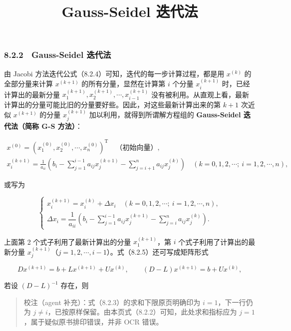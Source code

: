 \documentclass[
  10pt,
  fontset=fandol]{ctexart}
\title{Gauss-Seidel 迭代法}
\author{}
\date{}
\begin{document}
\maketitle

\subsubsection{8.2.2　Gauss-Seidel 迭代法}\label{gauss-seidel-ux8fedux4ee3ux6cd5}

由 Jacobi 方法迭代公式（8.2.4）可知，迭代的每一步计算过程，都是用 \(x^{(k)}\) 的全部分量来计算 \(x^{(k+1)}\) 的所有分量，显然在计算第 \(i\) 个分量 \(x_i^{(k+1)}\) 时，已经计算出的最新分量 \(x_1^{(k+1)},x_2^{(k+1)},\cdots,x_{i-1}^{(k+1)}\) 没有被利用。从直观上看，最新计算出的分量可能比旧的分量要好些。因此，对这些最新计算出来的第 \(k+1\) 次近似 \(x^{(k+1)}\) 的分量 \(x_j^{(k+1)}\) 加以利用，就得到所谓解方程组的 \textbf{Gauss-Seidel 迭代法（简称 G-S 方法）}：

\[
\begin{gathered}
x^{(0)}=(x_1^{(0)},x_2^{(0)},\cdots,x_n^{(0)})^{\mathrm T}\quad\text{（初始向量）},\\[4pt]
x_i^{(k+1)}=\frac1{a_{ii}}\left(b_i-\sum_{j=1}^{i-1}a_{ij}x_j^{(k+1)}-\sum_{j=i+1}^{n}a_{ij}x_j^{(k)}\right)\quad(k=0,1,2,\cdots;\ i=1,2,\cdots,n),
\end{gathered}
\tag{8.2.5}
\]

或写为

\[
\begin{cases}
x_i^{(k+1)}=x_i^{(k)}+\Delta x_i\quad(k=0,1,2,\cdots;\ i=1,2,\cdots,n),\\[4pt]
\Delta x_i=\dfrac1{a_{ii}}\left(b_i-\displaystyle\sum_{j=1}^{i-1}a_{ij}x_j^{(k+1)}-\displaystyle\sum_{j=i}^{n}a_{ij}x_j^{(k)}\right).
\end{cases}
\tag{8.2.5'}
\]

上面第 2 个式子利用了最新计算出的分量 \(x_1^{(k+1)}\)，第 \(i\) 个式子利用了计算出的最新分量 \(x_j^{(k+1)}\)（\(j=1,2,\cdots,i-1\)）。式（8.2.5）还可写成矩阵形式

\[
Dx^{(k+1)}=b+Lx^{(k+1)}+Ux^{(k)},\qquad(D-L)x^{(k+1)}=b+Ux^{(k)},
\]

若设 \((D-L)^{-1}\) 存在，则

\begin{quote}
校注（agent 补充）：式（8.2.3）的求和下限原页明确印为 \(i=1\)，下一行仍为 \(j\neq i\)，已按原样保留。由本页式（8.2.2）可知，此处求和指标应为 \(j=1\)，属于疑似原书排印错误，并非 OCR 错误。
\end{quote}
\end{document}
